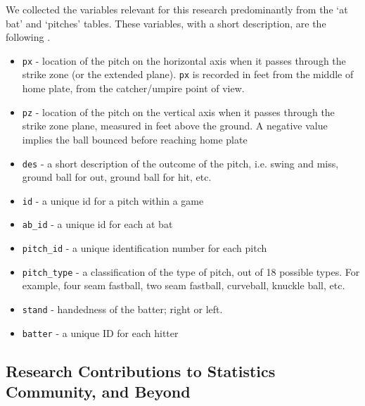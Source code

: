 We collected the variables relevant for this research predominantly from the `at bat' and `pitches' tables. These variables, with a short description, are the following \citep{Fast2007}.
  \begin{itemize}
  \item \verb|px| - location of the pitch on the horizontal axis when it passes through the strike zone (or the extended plane). \verb|px| is recorded in feet from the middle of home plate, from the catcher/umpire point of view.
  \item \verb|pz| - location of the pitch on the vertical axis when it passes through the strike zone plane, measured in feet above the ground. A negative value implies the ball bounced before reaching home plate
  \item \verb|des| - a short description of the outcome of the pitch, i.e. swing and miss, ground ball for out, ground ball for hit, etc.  
  \item \verb|id| - a unique id for a pitch within a game
  \item \verb|ab_id| - a unique id for each at bat  
  \item \verb|pitch_id| - a unique identification number for each pitch
  \item \verb|pitch_type| - a classification of the type of pitch, out of 18 possible types. For example, four seam fastball, two seam fastball, curveball, knuckle ball, etc.
  \item \verb|stand| - handedness of the batter; right or left.
  \item \verb|batter| - a unique ID for each hitter
  \end{itemize}


\subsection{Research Contributions to Statistics Community, and Beyond}


